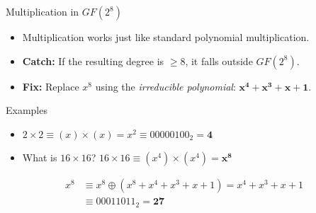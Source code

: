 \documentclass{cubeamer}
\begin{document}
\begin{frame}{Multiplication in $GF(2^8)$}
    \begin{itemize}
        \item Multiplication works just like standard polynomial multiplication.
        \item \textbf{Catch:} If the resulting degree is $\ge 8$, it falls outside $GF(2^8)$.
        \item \textbf{Fix:} Replace $x^8$ using the \textit{irreducible polynomial}: $\mathbf{x^4 + x^3 + x + 1}$.
    \end{itemize}

    \begin{block}{Examples}
        \begin{itemize}
            \item $2 \times 2 \equiv (x) \times (x) = x^2 \equiv 00000100_2 = \mathbf{4}$
            \pause
            \item What is $16 \times 16$? \pause $16 \times 16 \equiv (x^4) \times (x^4) = \mathbf{x^8}$
        \end{itemize}
        \pause
        \begin{align*}
            x^8 &\equiv x^8 \oplus (x^8 + x^4 + x^3 + x + 1) = x^4 + x^3 + x + 1 \\
                &\equiv 00011011_2 = \mathbf{27}
        \end{align*}
    \end{block}
\end{frame}
\end{document}
